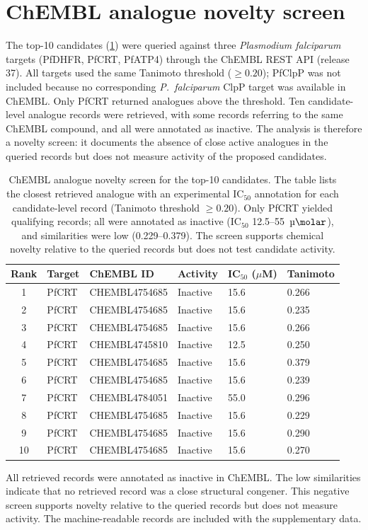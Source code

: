 \documentclass[11pt,a4paper]{article}
\begin{document}
\section{ChEMBL analogue novelty screen}
\label{sec:chembl_validation}

The top-10 candidates (\cref{tab:chembl_validation_top10}) were queried against three \textit{Plasmodium falciparum} targets (PfDHFR, PfCRT, PfATP4) through the ChEMBL REST API (release 37). All targets used the same Tanimoto threshold ($\geq 0.20$); PfClpP was not included because no corresponding \textit{P.~falciparum} ClpP target was available in ChEMBL. Only PfCRT returned analogues above the threshold. Ten candidate-level analogue records were retrieved, with some records referring to the same ChEMBL compound, and all were annotated as inactive. The analysis is therefore a novelty screen: it documents the absence of close active analogues in the queried records but does not measure activity of the proposed candidates.

\begin{table}[htbp]
\centering
\caption{ChEMBL analogue novelty screen for the top-10 candidates. The table lists the closest retrieved analogue with an experimental IC$_{50}$ annotation for each candidate-level record (Tanimoto threshold $\geq 0.20$). Only PfCRT yielded qualifying records; all were annotated as inactive (IC$_{50}$ 12.5--55~$\si{\micro\molar}$), and similarities were low (0.229--0.379). The screen supports chemical novelty relative to the queried records but does not test candidate activity.}
\label{tab:chembl_validation_top10}
\small
\begin{tabularx}{\textwidth}{c l l l l l}
\toprule
Rank & Target & ChEMBL ID & Activity & {IC$_{50}$ ($\mu$M)} & Tanimoto \\
\midrule
1 & PfCRT & CHEMBL4754685 & Inactive & 15.6 & 0.266 \\
2 & PfCRT & CHEMBL4754685 & Inactive & 15.6 & 0.235 \\
3 & PfCRT & CHEMBL4754685 & Inactive & 15.6 & 0.266 \\
4 & PfCRT & CHEMBL4745810 & Inactive & 12.5 & 0.250 \\
5 & PfCRT & CHEMBL4754685 & Inactive & 15.6 & 0.379 \\
6 & PfCRT & CHEMBL4754685 & Inactive & 15.6 & 0.239 \\
7 & PfCRT & CHEMBL4784051 & Inactive & 55.0 & 0.296 \\
8 & PfCRT & CHEMBL4754685 & Inactive & 15.6 & 0.229 \\
9 & PfCRT & CHEMBL4754685 & Inactive & 15.6 & 0.290 \\
10 & PfCRT & CHEMBL4754685 & Inactive & 15.6 & 0.270 \\
\bottomrule
\end{tabularx}
\vspace{1mm}
\footnotesize All retrieved records were annotated as inactive in ChEMBL. The low similarities indicate that no retrieved record was a close structural congener. This negative screen supports novelty relative to the queried records but does not measure activity. The machine-readable records are included with the supplementary data.
\end{table}
\end{document}
